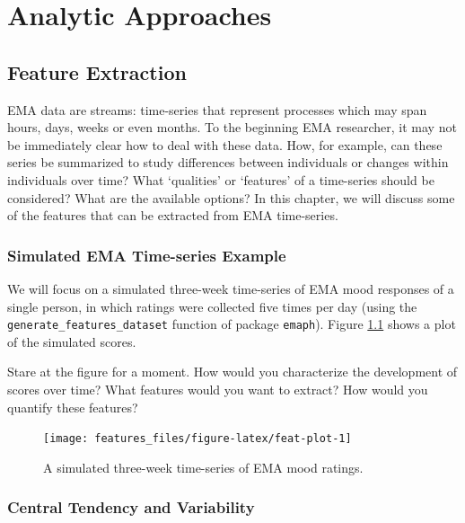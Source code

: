 \documentclass[]{book}
\begin{document}
\part{Analytic Approaches}\label{part-analytic-approaches}

\chapter{Feature Extraction}\label{features}

EMA data are streams: time-series that represent processes which may
span hours, days, weeks or even months. To the beginning EMA researcher,
it may not be immediately clear how to deal with these data. How, for
example, can these series be summarized to study differences between
individuals or changes within individuals over time? What `qualities' or
`features' of a time-series should be considered? What are the available
options? In this chapter, we will discuss some of the features that can
be extracted from EMA time-series.

\section{Simulated EMA Time-series
Example}\label{simulated-ema-time-series-example}


We will focus on a simulated three-week time-series of EMA mood
responses of a single person, in which ratings were collected five times
per day (using the \texttt{generate\_features\_dataset} function of
package \texttt{emaph}). Figure \ref{fig:feat-plot} shows a plot of the
simulated scores.

Stare at the figure for a moment. How would you characterize the
development of scores over time? What features would you want to
extract? How would you quantify these features?

\begin{figure}

{\centering \texttt{[image: features\_files/figure-latex/feat-plot-1]} 

}

\caption{A simulated three-week time-series of EMA mood ratings.}\label{fig:feat-plot}
\end{figure}

\section{Central Tendency and
Variability}\label{central-tendency-and-variability}
\end{document}
